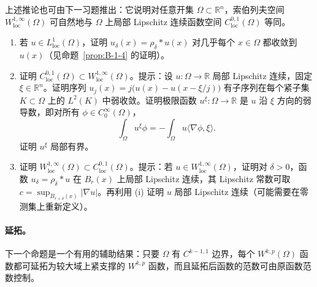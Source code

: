 上述推论也可由下一习题推出：它说明对任意开集 $\Omega\subset\mathbb R^n$，索伯列夫空间 $W_{\mathrm{loc}}^{1,\infty}(\Omega)$ 可自然地与 $\Omega$ 上局部 Lipschitz 连续函数空间 $C_{\mathrm{loc}}^{0,1}(\Omega)$ 等同。

\begin{exercise}\label{ex:B-1-8}
\begin{enumerate}[label=(\roman*)]
\item 若 $u\in L^1_{\mathrm{loc}}(\Omega)$，证明 $u_\delta(x)=\rho_\delta*u(x)$ 对几乎每个 $x\in\Omega$ 都收敛到 $u(x)$（见命题~\ref{prop:B-1-4} 的证明）。
\item 证明 $C_{\mathrm{loc}}^{0,1}(\Omega)\subset W_{\mathrm{loc}}^{1,\infty}(\Omega)$。提示：设 $u:\Omega\to\mathbb R$ 局部 Lipschitz 连续，固定 $\xi\in\mathbb R^n$。证明序列 $u_j(x)=j\bigl(u(x)-u(x-\xi/j)\bigr)$ 有子序列在每个紧子集 $K\subset\Omega$ 上的 $L^2(K)$ 中弱收敛。证明极限函数 $u^\xi:\Omega\to\mathbb R$ 是 $u$ 沿 $\xi$ 方向的弱导数，即对所有 $\phi\in C_0^\infty(\Omega)$，
\[
  \int_\Omega u^\xi\phi=-\int_\Omega u\langle\nabla\phi,\xi\rangle.
\]
证明 $u^\xi$ 局部有界。
\item 证明 $W_{\mathrm{loc}}^{1,\infty}(\Omega)\subset C_{\mathrm{loc}}^{0,1}(\Omega)$。提示：若 $u\in W_{\mathrm{loc}}^{1,\infty}(\Omega)$，证明对 $\delta>0$，函数 $u_\delta=\rho_\delta*u$ 在 $B_r(x)$ 上局部 Lipschitz 连续，其 Lipschitz 常数可取 $c=\sup_{B_{r+\delta}(x)}|\nabla u|$。再利用 (i) 证明 $u$ 局部 Lipschitz 连续（可能需要在零测集上重新定义）。
\end{enumerate}
\end{exercise}

\paragraph{延拓。} 下一个命题是一个有用的辅助结果：只要 $\Omega$ 有 $C^{k-1,1}$ 边界，每个 $W^{k,p}(\Omega)$ 函数都可延拓为较大域上紧支撑的 $W^{k,p}$ 函数，而且延拓后函数的范数可由原函数范数控制。


